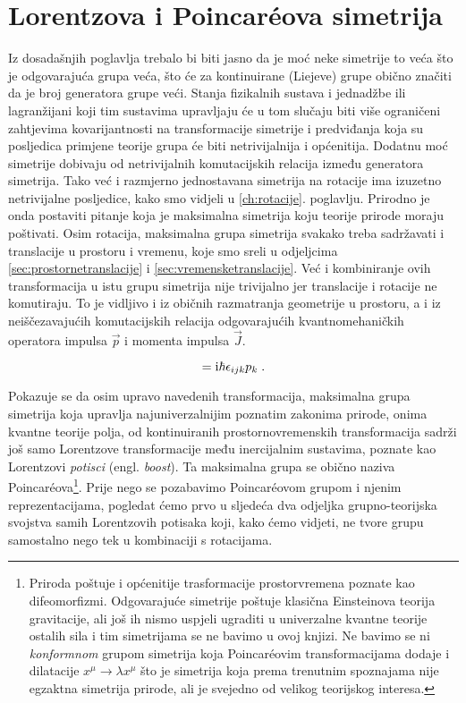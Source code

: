 
\chapter{Lorentzova i Poincar\'{e}ova simetrija}

Iz dosadašnjih poglavlja trebalo bi biti jasno da je moć
neke simetrije to veća što je odgovarajuća grupa veća, što
će za kontinuirane (Liejeve) grupe obično značiti da je broj generatora
grupe veći. Stanja fizikalnih sustava i jednadžbe ili lagranžijani
koji tim sustavima upravljaju
će u tom slučaju biti više ograničeni zahtjevima kovarijantnosti
na transformacije simetrije i predviđanja koja su posljedica
primjene teorije grupa će biti netrivijalnija i općenitija.
Dodatnu moć simetrije dobivaju od netrivijalnih komutacijskih
relacija između generatora simetrija.
Tako već i razmjerno jednostavana simetrija na rotacije ima izuzetno
netrivijalne posljedice, kako smo vidjeli u \ref{ch:rotacije}. poglavlju.
Prirodno je onda postaviti pitanje koja je maksimalna
simetrija koju teorije prirode moraju poštivati. Osim rotacija,
maksimalna grupa simetrija svakako treba sadržavati i translacije
u prostoru i vremenu, koje smo sreli u odjeljcima
\ref{sec:prostornetranslacije} i \ref{sec:vremensketranslacije}.
Već i kombiniranje ovih transformacija u istu grupu simetrija
nije trivijalno jer translacije i rotacije ne komutiraju. To je
vidljivo i iz običnih razmatranja geometrije u prostoru, a i iz 
neiščezavajućih komutacijskih relacija odgovarajućih
kvantnomehaničkih operatora impulsa $\vec{p}$ i momenta
impulsa $\vec{J}$.

\begin{equation}
    [J_{i}, p_{j}] = \rmi \hbar \epsilon_{ijk} p_{k} \;.
    \label{eq:jpkomutacijske}
\end{equation}

Pokazuje se da osim upravo navedenih transformacija, maksimalna
grupa simetrija koja upravlja najuniverzalnijim poznatim zakonima
prirode, onima kvantne teorije polja, od kontinuiranih prostornovremenskih
transformacija sadrži još samo Lorentzove transformacije među inercijalnim sustavima,
poznate kao Lorentzovi \emph{potisci} (engl. \emph{boost}).
Ta maksimalna grupa se obično naziva Poincar\'{e}ova\footnote{Priroda poštuje
    i općenitije trasformacije prostorvremena poznate kao difeomorfizmi. 
    Odgovarajuće simetrije poštuje klasična Einsteinova teorija gravitacije, ali još
    ih nismo uspjeli ugraditi u univerzalne kvantne teorije ostalih sila i
    tim simetrijama se ne bavimo u ovoj knjizi. Ne bavimo se ni \emph{konformnom}
    grupom simetrija koja Poincar\'{e}ovim transformacijama dodaje i
    dilatacije $x^{\mu}\to\lambda x^{\mu}$ što je simetrija koja prema
    trenutnim spoznajama nije egzaktna simetrija prirode,
    ali je svejedno od velikog teorijskog interesa.}.
Prije nego se pozabavimo Poincar\'{e}ovom grupom i njenim reprezentacijama,
pogledat ćemo prvo u sljedeća dva odjeljka grupno-teorijska svojstva samih
Lorentzovih potisaka koji, kako ćemo vidjeti, ne tvore grupu samostalno
nego tek u kombinaciji s rotacijama.


